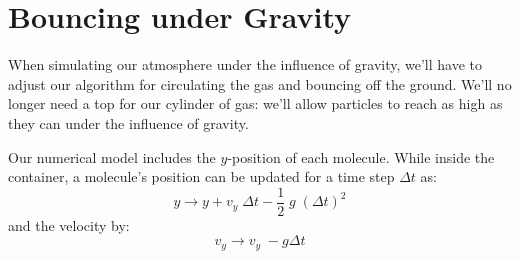 \documentclass[12pt]{article}
\begin{document}
\section{Bouncing under Gravity}

When simulating our atmosphere under the influence of gravity, we'll
have to adjust our algorithm for circulating the gas and bouncing off
the ground.  We'll no longer need a top for our cylinder of gas: we'll
allow particles to reach as high as they can under the influence of
gravity.

Our numerical model includes the $y$-position of each molecule.
While inside the container, a molecule's position can be updated for
a time step $\Delta t$ as:
\begin{equation}
y \to y + v_y \; \Delta t - \frac{1}{2} \; g \; (\Delta t)^2
\end{equation}
and the velocity by:
\begin{equation}
v_y \to v_y \; - g \Delta t
\end{equation}
\end{document}
